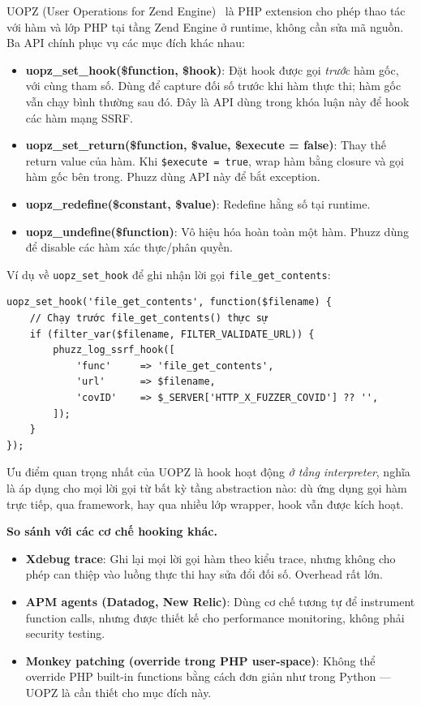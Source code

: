 UOPZ (User Operations for Zend Engine)~\cite{phpgroup2023uopz} là PHP extension
cho phép thao tác với hàm và lớp PHP tại tầng Zend Engine ở runtime, không
cần sửa mã nguồn. Ba API chính phục vụ các mục đích khác nhau:

\begin{itemize}
    \item \textbf{uopz\_set\_hook(\$function, \$hook)}: Đặt hook được gọi
    \emph{trước} hàm gốc, với cùng tham số. Dùng để capture đối số trước khi
    hàm thực thi; hàm gốc vẫn chạy bình thường sau đó. Đây là API dùng trong
    khóa luận này để hook các hàm mạng SSRF.
    \item \textbf{uopz\_set\_return(\$function, \$value, \$execute = false)}:
    Thay thế return value của hàm. Khi \texttt{\$execute = true}, wrap hàm
    bằng closure và gọi hàm gốc bên trong. Phuzz dùng API này để bắt exception.
    \item \textbf{uopz\_redefine(\$constant, \$value)}: Redefine hằng số tại
    runtime.
    \item \textbf{uopz\_undefine(\$function)}: Vô hiệu hóa hoàn toàn một hàm.
    Phuzz dùng để disable các hàm xác thực/phân quyền.
\end{itemize}

Ví dụ về \texttt{uopz\_set\_hook} để ghi nhận lời gọi \texttt{file\_get\_contents}:

\begin{verbatim}
uopz_set_hook('file_get_contents', function($filename) {
    // Chạy trước file_get_contents() thực sự
    if (filter_var($filename, FILTER_VALIDATE_URL)) {
        phuzz_log_ssrf_hook([
            'func'     => 'file_get_contents',
            'url'      => $filename,
            'covID'    => $_SERVER['HTTP_X_FUZZER_COVID'] ?? '',
        ]);
    }
});
\end{verbatim}

Ưu điểm quan trọng nhất của UOPZ là hook hoạt động \emph{ở tầng interpreter},
nghĩa là áp dụng cho mọi lời gọi từ bất kỳ tầng abstraction nào: dù ứng dụng
gọi hàm trực tiếp, qua framework, hay qua nhiều lớp wrapper, hook vẫn được
kích hoạt.

\textbf{So sánh với các cơ chế hooking khác.}
\begin{itemize}
    \item \textbf{Xdebug trace}: Ghi lại mọi lời gọi hàm theo kiểu trace,
    nhưng không cho phép can thiệp vào luồng thực thi hay sửa đổi đối số.
    Overhead rất lớn.
    \item \textbf{APM agents (Datadog, New Relic)}: Dùng cơ chế tương tự để
    instrument function calls, nhưng được thiết kế cho performance monitoring,
    không phải security testing.
    \item \textbf{Monkey patching (override trong PHP user-space)}: Không thể
    override PHP built-in functions bằng cách đơn giản như trong Python ---
    UOPZ là cần thiết cho mục đích này.
\end{itemize}

